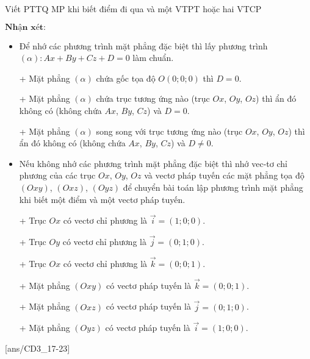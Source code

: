 \begin{dang}{Viết PTTQ MP khi biết điểm đi qua và một VTPT hoặc hai VTCP}
\begin{enumerate}[a.]
	\end{enumerate}
	$\textbf{Nhận xét:}$
	\begin{itemize}
		\item Để nhớ các phương trình mặt phẳng đặc biệt thì lấy phương trình $\left(\alpha\right) \colon Ax+By+Cz+D=0$  làm chuẩn.
		\item[+] Mặt phẳng $\left(\alpha\right)$ chứa gốc tọa độ $O\left(0;0;0\right)$ thì $D=0$.
		\item[+] Mặt phẳng $\left(\alpha\right)$ chứa trục tương ứng nào (trục $Ox$, $Oy$, $Oz$) thì ẩn đó không có (không chứa $Ax$, $By$, $Cz$) và $D=0$.
		\item[+] Mặt phẳng $\left(\alpha\right)$ song song với trục tương ứng nào (trục $Ox$, $Oy$, $Oz$) thì ẩn đó không có (không chứa $Ax$, $By$, $Cz$) và $D \neq 0$.
		\item Nếu không nhớ các phương trình mặt phẳng đặc biệt thì nhớ vec-tơ chỉ phương của các trục $Ox$, $Oy$, $Oz$ và vectơ pháp tuyến các mặt phẳng tọa độ $\left(Oxy\right)$, $\left(Oxz\right)$, $\left(Oyz\right)$ để chuyển bài toán lập phương trình mặt phẳng khi biết một điểm và một vectơ pháp tuyến.
		\item[+] Trục $Ox$ có vectơ chỉ phương là $\overrightarrow{i} = \left(1;0;0\right)$.
		\item[+] Trục $Oy$ có vectơ chỉ phương là $\overrightarrow{j} = \left(0;1;0\right)$.
		\item[+] Trục $Ox$ có vectơ chỉ phương là $\overrightarrow{k} = \left(0;0;1\right)$.
		\item[+] Mặt phẳng $\left(Oxy\right)$ có vectơ pháp tuyến là $\overrightarrow{k} = \left(0;0;1\right)$.
		\item[+] Mặt phẳng $\left(Oxz\right)$ có vectơ pháp tuyến là $\overrightarrow{j} = \left(0;1;0\right)$.
		\item[+] Mặt phẳng $\left(Oyz\right)$ có vectơ pháp tuyến là $\overrightarrow{i} = \left(1;0;0\right)$.
	\end{itemize}
\end{dang}

[ans/CD3_17-23]
\TN

